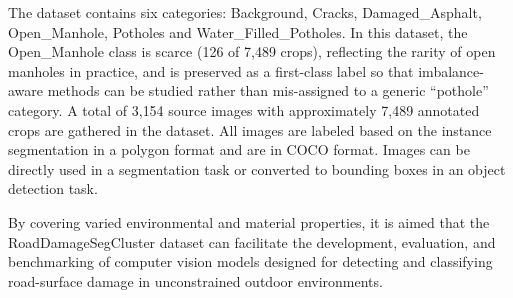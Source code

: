 \documentclass{article}
\begin{document}
The dataset contains six categories: Background, Cracks, Damaged\_Asphalt, Open\_Manhole, Potholes and Water\_Filled\_Potholes. In this dataset, the Open\_Manhole class is scarce (126 of 7{,}489 crops), reflecting the rarity of open manholes in practice, and is preserved as a first-class label so that imbalance-aware methods can be studied rather than mis-assigned to a generic ``pothole'' category. A total of 3{,}154 source images with approximately 7{,}489 annotated crops are gathered in the dataset. All images are labeled based on the instance segmentation in a polygon format and are in COCO format. Images can be directly used in a segmentation task or converted to bounding boxes in an object detection task.

By covering varied environmental and material properties, it is aimed that the RoadDamageSegCluster dataset can facilitate the development, evaluation, and benchmarking of computer vision models designed for detecting and classifying road-surface damage in unconstrained outdoor environments.
\end{document}

